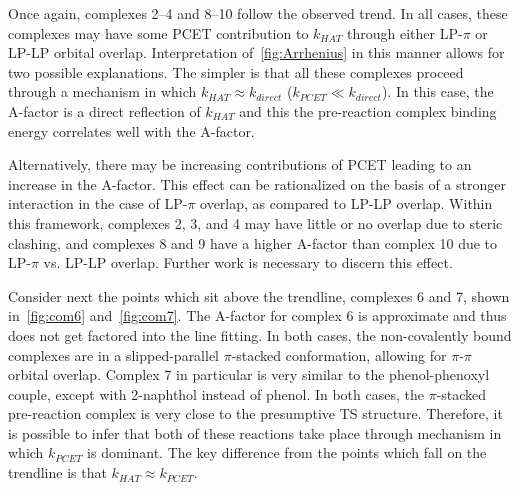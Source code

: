 Once again, complexes 2--4 and 8--10 follow the observed trend. In all cases,
these complexes may have some PCET contribution to $k_{HAT}$ through either
LP-$\pi$ or LP-LP orbital overlap. Interpretation of~\ref{fig:Arrhenius} in this
manner allows for two possible explanations. The simpler is that all these
complexes proceed through a mechanism in which $k_{HAT} \approx k_{direct}$
($k_{PCET} \ll k_{direct}$). In this case, the A-factor is a direct reflection
of $k_{HAT}$ and this the pre-reaction complex binding energy correlates well
with the A-factor.

Alternatively, there may be increasing contributions of PCET leading to an
increase in the A-factor. This effect can be rationalized on the basis of a
stronger interaction in the case of LP-$\pi$ overlap, as compared to LP-LP
overlap. Within this framework, complexes 2, 3, and 4 may have little or no
overlap due to steric clashing, and complexes 8 and 9 have a higher A-factor
than complex 10 due to LP-$\pi$ vs. LP-LP overlap. Further work is necessary to
discern this effect.

Consider next the points which sit above the trendline, complexes 6 and 7, shown
in~\ref{fig:com6} and~\ref{fig:com7}. The A-factor for complex 6 is approximate
and thus does not get factored into the line fitting. In both cases, the
non-covalently bound complexes are in a slipped-parallel $\pi$-stacked
conformation, allowing for $\pi$-$\pi$ orbital overlap.  Complex 7 in particular
is very similar to the phenol-phenoxyl couple, except with 2-naphthol instead of
phenol. In both cases, the $\pi$-stacked pre-reaction complex is very close to
the presumptive TS structure. Therefore, it is possible to infer that both of
these reactions take place through mechanism in which $k_{PCET}$ is dominant.
The key difference from the points which fall on the trendline is that $k_{HAT}
\approx k_{PCET}$.

